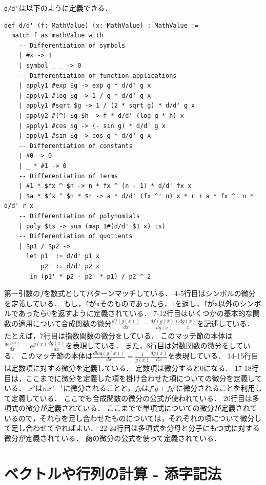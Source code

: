 \lstinline{d/d'}は以下のように定義できる．
\begin{lstlisting}[language=egison]
def d/d' (f: MathValue) (x: MathValue) : MathValue :=
  match f as mathValue with
    -- Differentiation of symbols
    | #x -> 1
    | symbol _ _ -> 0
    -- Differentiation of function applications
    | apply1 #exp $g -> exp g * d/d' g x
    | apply1 #log $g -> 1 / g * d/d' g x
    | apply1 #sqrt $g -> 1 / (2 * sqrt g) * d/d' g x
    | apply2 #(^) $g $h -> f * d/d' (log g * h) x
    | apply1 #cos $g -> (- sin g) * d/d' g x
    | apply1 #sin $g -> cos g * d/d' g x
    -- Differentiation of constants
    | #0 -> 0
    | _ * #1 -> 0
    -- Differentiation of terms
    | #1 * $fx ^ $n -> n * fx ^ (n - 1) * d/d' fx x
    | $a * $fx ^ $n * $r -> a * d/d' (fx ^' n) x * r + a * fx ^' n * d/d' r x
    -- Differentiation of polynomials
    | poly $ts -> sum (map 1#(d/d' $1 x) ts)
    -- Differentiation of quotients
    | $p1 / $p2 ->
      let p1' := d/d' p1 x
          p2' := d/d' p2 x
       in (p1' * p2 - p2' * p1) / p2 ^ 2
\end{lstlisting}
第一引数の$f$を数式としてパターンマッチしている．
4-5行目はシンボルの微分を定義している．
もし，\lstinline{f}が\lstinline{x}そのものであったら，$1$を返し，\lstinline{f}が\lstinline{x}以外のシンボルであったら$0$を返すように定義されている．
7-12行目はいくつかの基本的な関数の適用について合成関数の微分$\frac{df(g(x))}{dx} = \frac{df(g(x))}{dg(x)} \frac{dg(x)}{x}$を記述している．
たとえば，7行目は指数関数の微分をしている．
このマッチ節の本体は$\frac{de^{g(x)}}{dx} = e^{g(x)} \frac{dg(x)}{dx}$を表現している．
また，8行目は対数関数の微分をしている．
このマッチ節の本体は$\frac{dlog(g(x))}{dx} = \frac{1}{g(x)} \frac{dg(x)}{dx}$を表現している．
14-15行目は定数項に対する微分を定義している．
定数項は微分すると$0$になる．
17-18行目は，ここまでに微分を定義した項を掛け合わせた項についての微分を定義している．
$x^n$は$n x^{n-1}$に微分されることと，$f g$は$f' g + f g'$に微分されることを利用して定義している．
ここでも合成関数の微分の公式が使われている．
20行目は多項式の微分が定義されている．
ここまでで単項式についての微分が定義されているので，それらを足し合わせたものについては，それぞれの項について微分して足し合わせてやればよい．
22-24行目は多項式を分母と分子にもつ式に対する微分が定義されている．
商の微分の公式を使って定義されている．

\section{ベクトルや行列の計算 - 添字記法}\label{cas-linear}

